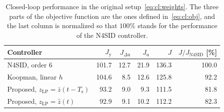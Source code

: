 \documentclass[preprint,12pt,authoryear]{elsarticle}
\theoremstyle{remark}
\DeclareMathOperator{\diag}{diag}
\newcommand{\ui}[2]{#1_{\text{#2}}}
\newcommand{\Ts}{\ui{T}{s}}
\begin{document}
\begin{table}[h]
  \centering
  \small
  \setlength{\tabcolsep}{5pt}
  \caption{Closed-loop performance in the original setup~\eqref{eq:cl:weights}. The three parts of the objective function are the ones defined in~\eqref{eq:cl:obj}, and the last column is normalized so that $100\%$ stands for the performance of the N4SID controller.}
  \label{tab:cl-original}
  \begin{tabular}{lrrrrr}
    \toprule
    Controller & $\ui{J}{y}$ & $J_{\Delta\text{u}}$ & $\ui{J}{u}$ & $J$ & $J/\ui{J}{N4SID}$ [\%] \\
    \midrule
    N4SID, order $6$ & 101.7 & 12.7 & 21.9 & 136.3 & 100.0 \\
    Koopman, linear $h$ & 104.6 & 8.5 & 12.6 & 125.8 & 92.2 \\
    Proposed, $\ui{z}{LP} = \bar{z}(t-\Ts)$ & 93.2 & 9.0 & 9.3 & 111.5 & 81.8 \\
    Proposed, $\ui{z}{LP} = \hat{z}(t)$ & 92.9 & 9.1 & 10.2 & 112.2 & 82.3 \\
    \bottomrule
  \end{tabular}
\end{table}

\end{document}
